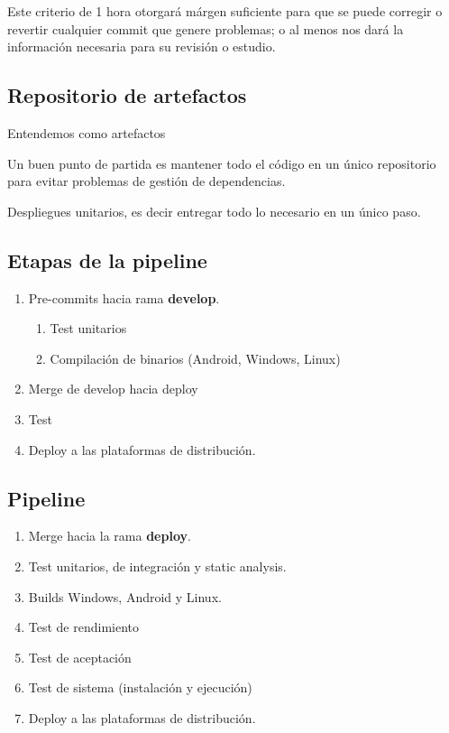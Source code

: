 Este criterio de 1 hora otorgará márgen suficiente para que se puede corregir o
revertir cualquier commit que genere problemas; o al menos nos dará la
información necesaria para su revisión o estudio.

\subsection{Repositorio de artefactos}

Entendemos como artefactos

Un buen punto de partida es mantener todo el código en un único repositorio
para evitar problemas de gestión de dependencias.

Despliegues unitarios, es decir entregar todo lo necesario en un único paso.

\subsection{Etapas de la pipeline}




\begin{enumerate}
  \item Pre-commits hacia rama \textbf{develop}.
  \begin{enumerate}
    \item Test unitarios
    \item Compilación de binarios (Android, Windows, Linux)
  \end{enumerate}
  \item Merge de develop hacia deploy
  \item Test
  \item Deploy a las plataformas de distribución.
\end{enumerate}

\subsection{Pipeline}

\begin{enumerate}
  \item Merge hacia la rama \textbf{deploy}.
  \item Test unitarios, de integración y static analysis.
  \item Builds Windows, Android y Linux.
  \item Test de rendimiento
  \item Test de aceptación
  \item Test de sistema (instalación y ejecución)
  \item Deploy a las plataformas de distribución.
\end{enumerate}


